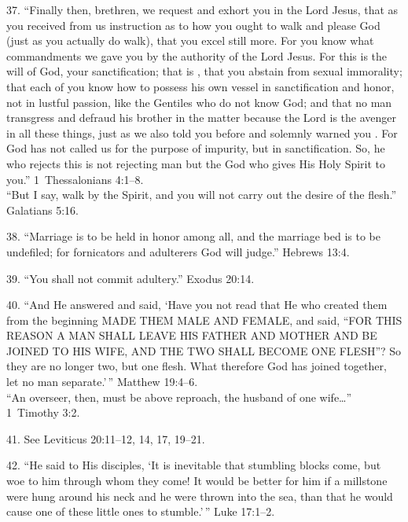 \documentclass[
]{book}
\begin{document}
37. ``Finally then, brethren, we request and exhort you in the Lord Jesus, that as you received from us instruction as to how you ought to walk and please God (just as you actually do walk), that you excel still more. For you know what commandments we gave you by the authority of the Lord Jesus. For this is the will of God, your sanctification; that is , that you abstain from sexual immorality; that each of you know how to possess his own vessel in sanctification and honor, not in lustful passion, like the Gentiles who do not know God; and that no man transgress and defraud his brother in the matter because the Lord is the avenger in all these things, just as we also told you before and solemnly warned you . For God has not called us for the purpose of impurity, but in sanctification. So, he who rejects this is not rejecting man but the God who gives His Holy Spirit to you.'' 1~Thessalonians 4:1--8.\\
\hspace*{0.333em}\hspace*{0.333em}\hspace*{0.333em}\hspace*{0.333em}``But I say, walk by the Spirit, and you will not carry out the desire of the flesh.'' Galatians 5:16.

38. ``Marriage is to be held in honor among all, and the marriage bed is to be undefiled; for fornicators and adulterers God will judge.'' Hebrews 13:4.

39. ``You shall not commit adultery.'' Exodus 20:14.

40. ``And He answered and said, `Have you not read that He who created them from the beginning MADE THEM MALE AND FEMALE, and said, ``FOR THIS REASON A MAN SHALL LEAVE HIS FATHER AND MOTHER AND BE JOINED TO HIS WIFE, AND THE TWO SHALL BECOME ONE FLESH''? So they are no longer two, but one flesh. What therefore God has joined together, let no man separate.'\,'' Matthew 19:4--6.\\
\hspace*{0.333em}\hspace*{0.333em}\hspace*{0.333em}\hspace*{0.333em}``An overseer, then, must be above reproach, the husband of one wife\ldots{}'' 1~Timothy 3:2.

41. See Leviticus 20:11--12, 14, 17, 19--21.

42. ``He said to His disciples, `It is inevitable that stumbling blocks come, but woe to him through whom they come! It would be better for him if a millstone were hung around his neck and he were thrown into the sea, than that he would cause one of these little ones to stumble.'\,'' Luke 17:1--2.
\end{document}
